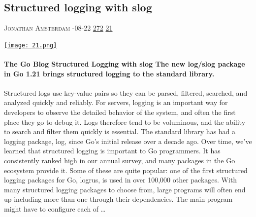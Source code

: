 \documentclass[10pt,a4paper]{article}
\begin{document}
\begin{multicols}{2}
\begin{minipage}{\linewidth}
\subsection{Structured logging with slog}
\textsc{\footnotesize
{\scriptsize\faUser}\space 
Jonathan Amsterdam 
{\scriptsize\faCalendar}-08-22 
{\scriptsize\faThumbsOUp}\space 
\href{http://news.ycombinator.com/item?id=37224651\&utm\_term=comment}{272} 
{\scriptsize\faComments}\space 
\href{http://news.ycombinator.com/item?id=37224651\&utm\_term=comment}{21} 
}
\par\medskip\noindent
\href{https://go.dev/blog/slog?utm\_source=hackernewsletter\&utm\_medium=email\&utm\_term=code}{
    \texttt{[image: 21.png]}
}
\end{minipage}
\paragraph{}
\textbf{The Go Blog
Structured Logging with slog
The new
log/slog package in Go 1.21 brings structured logging to the standard
library.}
\paragraph{}
 Structured logs use key-value pairs so they can be parsed, filtered,
searched, and analyzed quickly and reliably.
For servers, logging is an important way for developers to
observe the detailed behavior of the system, and often the first place they go
to debug it. Logs therefore tend to be voluminous, and the ability to search and
filter them quickly is essential.
The standard library has had a logging package,
log,
since Go’s initial release over a decade ago.
Over time,
we’ve learned that structured logging is important to Go programmers. It has
consistently ranked high in our annual survey, and many packages in the Go
ecosystem provide it. Some of these are quite popular: one of the first structured
logging packages for Go, logrus,
is used in over 100,000 other packages.
With many structured logging packages to choose from, large programs will often end up including more than one through their dependencies. The main program might have to configure each of
\dots\par
\noindent\begin{minipage}{\linewidth}
\medskip

\end{minipage}
\end{multicols}
\end{document}
